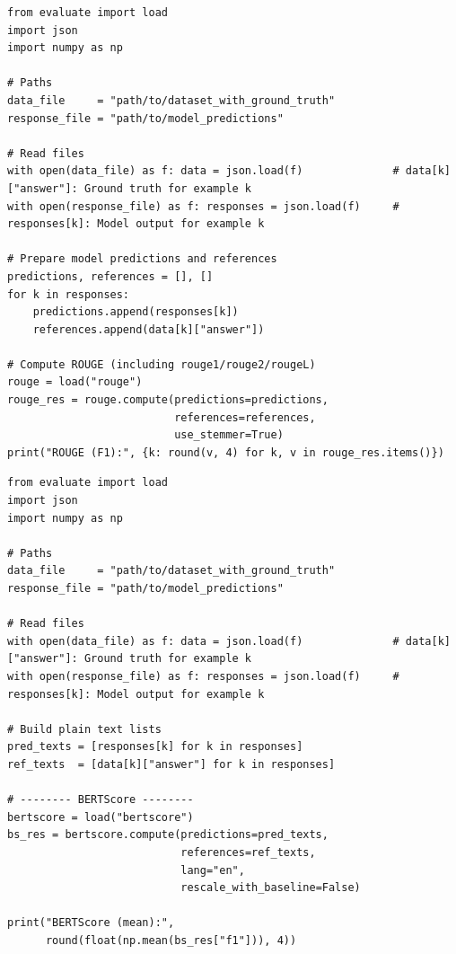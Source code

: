 \documentclass[11pt]{article}
\begin{document}
\begin{lstlisting}[style=python, float, floatplacement=t,
  caption={Computation of Rouge scores using the \texttt{evaluate} library},
  label={code:rouge_eval}]
from evaluate import load
import json
import numpy as np

# Paths
data_file     = "path/to/dataset_with_ground_truth"
response_file = "path/to/model_predictions"

# Read files
with open(data_file) as f: data = json.load(f)              # data[k]["answer"]: Ground truth for example k
with open(response_file) as f: responses = json.load(f)     # responses[k]: Model output for example k

# Prepare model predictions and references
predictions, references = [], []
for k in responses:
    predictions.append(responses[k])
    references.append(data[k]["answer"])

# Compute ROUGE (including rouge1/rouge2/rougeL)
rouge = load("rouge")
rouge_res = rouge.compute(predictions=predictions,
                          references=references,
                          use_stemmer=True)
print("ROUGE (F1):", {k: round(v, 4) for k, v in rouge_res.items()})
\end{lstlisting}


\begin{lstlisting}[style=python, float, floatplacement=t,
  caption={Computation of BERTScore using the \texttt{evaluate} library},
  label={code:bertscore_eval}]
from evaluate import load
import json
import numpy as np

# Paths
data_file     = "path/to/dataset_with_ground_truth"
response_file = "path/to/model_predictions"

# Read files
with open(data_file) as f: data = json.load(f)              # data[k]["answer"]: Ground truth for example k
with open(response_file) as f: responses = json.load(f)     # responses[k]: Model output for example k

# Build plain text lists
pred_texts = [responses[k] for k in responses]
ref_texts  = [data[k]["answer"] for k in responses]

# -------- BERTScore --------
bertscore = load("bertscore")
bs_res = bertscore.compute(predictions=pred_texts,
                           references=ref_texts,
                           lang="en",
                           rescale_with_baseline=False)

print("BERTScore (mean):",
      round(float(np.mean(bs_res["f1"])), 4))
\end{lstlisting}
\end{document}
